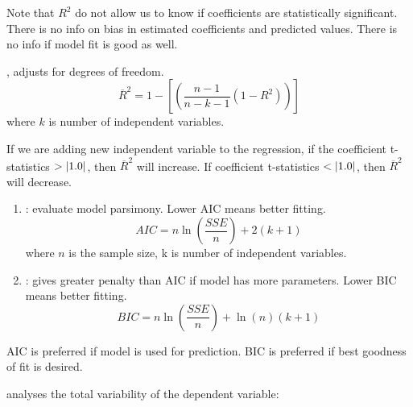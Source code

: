 Note that $R^2$ do not allow us to know if coefficients are statistically significant. There is no info on bias in estimated coefficients and predicted values. There is no info if model fit is good as well.

\begin{definition} , adjusts for degrees of freedom.
\begin{equation}
\overline{R}^2 = 1 - \left[\left(\frac{n-1}{n-k-1} (1-R^2) \right) \right] \nonumber
\end{equation}
where $k$ is number of independent variables.
\end{definition}

If we are adding new independent variable to the regression, if the coefficient t-statistics $> \left\lvert1.0\right\rvert$, then $\overline{R}^2$ will increase. If coefficient t-statistics $< \left\lvert1.0\right\rvert$, then $\overline{R}^2$ will decrease.

\begin{definition} 
\begin{enumerate}[label=\roman*.]
\setlength{\itemsep}{0pt}
\item {}: evaluate model parsimony. Lower AIC means better fitting.
\begin{equation}
AIC = n \ln(\frac{SSE}{n}) + 2(k+1) \nonumber
\end{equation}
where $n$ is the sample size, k is number of independent variables.
\item {}: gives greater penalty than AIC if model has more parameters. Lower BIC means better fitting.
\begin{equation}
BIC = n \ln(\frac{SSE}{n}) + \ln(n)(k+1) \nonumber
\end{equation}
\end{enumerate}
\end{definition}

AIC is preferred if model is used for prediction. BIC is preferred if best goodness of fit is desired.

\begin{definition}  analyses the total variability of the dependent variable:
\end{definition}
